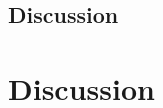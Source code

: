 



\subsection{Discussion}
\label{sec:id-model-discussion}

\section{Discussion}
\label{sec:ch4-discussion}
